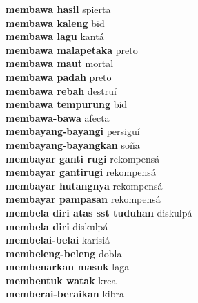 \textbf{ membawa hasil  } spierta \\
\textbf{ membawa kaleng  } bid \\
\textbf{ membawa lagu  } kantá \\
\textbf{ membawa malapetaka  } preto \\
\textbf{ membawa maut  } mortal \\
\textbf{ membawa padah  } preto \\
\textbf{ membawa rebah  } destruí \\
\textbf{ membawa tempurung  } bid \\
\textbf{ membawa-bawa  } afecta \\
\textbf{ membayang-bayangi  } persiguí \\
\textbf{ membayang-bayangkan  } soña \\
\textbf{ membayar ganti rugi  } rekompensá \\
\textbf{ membayar gantirugi  } rekompensá \\
\textbf{ membayar hutangnya  } rekompensá \\
\textbf{ membayar pampasan  } rekompensá \\
\textbf{ membela diri  atas sst tuduhan  } diskulpá \\
\textbf{ membela diri  } diskulpá \\
\textbf{ membelai-belai  } karisiá \\
\textbf{ membeleng-beleng  } dobla \\
\textbf{ membenarkan masuk  } laga \\
\textbf{ membentuk watak  } krea \\
\textbf{ memberai-beraikan  } kibra \\
